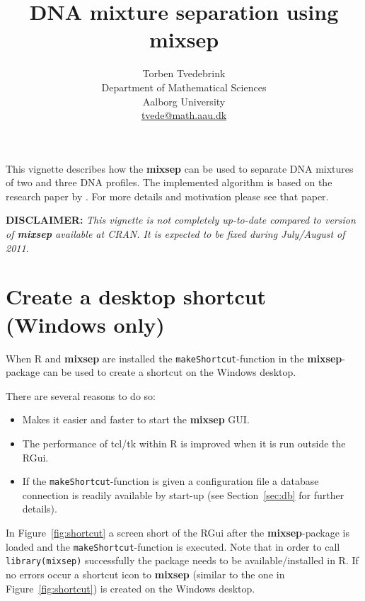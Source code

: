 \documentclass[a4paper,11pt]{article}
\newcommand{\code}[1]{\texttt{#1}}
\newcommand{\pkg}[1]{\textbf{#1}}
\begin{document}


\title{DNA mixture separation using \pkg{mixsep}}
\author{Torben Tvedebrink\\
  Department of Mathematical Sciences\\ Aalborg University\\
  \url{tvede@math.aau.dk}
}
\maketitle
\sloppy

\noindent This vignette describes how the \pkg{mixsep} can be used to
separate DNA mixtures of two and three DNA profiles. The implemented
algorithm is based on the research paper by \cite{tvedebrink2011}. For
more details and motivation please see that paper. 

\textbf{DISCLAIMER:} \textsl{This vignette is not completely
  up-to-date compared to version of \pkg{mixsep} available at CRAN. It
  is expected to be fixed during July/August of 2011.}

\tableofcontents

\newpage

\section{Create a desktop shortcut (Windows only)}
\label{sec:shortcut}

When \textsf{R} and \pkg{mixsep} are installed the
\code{makeShortcut}-function in the \pkg{mixsep}-package can be used
to create a shortcut on the Windows desktop. 

There are several reasons to do so: 
\begin{itemize}
\item Makes it easier and faster to start the \pkg{mixsep} GUI.
\item The performance of tcl/tk within R is improved when it is run
  outside the RGui.
\item If the \code{makeShortcut}-function is given a configuration
  file a database connection is readily available by start-up (see
  Section~\ref{sec:db} for further details).
\end{itemize}

In Figure~\ref{fig:shortcut} a screen short of the RGui after the
\pkg{mixsep}-package is loaded and the \code{makeShortcut}-function is
executed. Note that in order to call \code{library(mixsep)}
successfully the package needs to be available/installed in
\textsf{R}. If no errors occur a shortcut icon to \pkg{mixsep}
(similar to the one in Figure~\ref{fig:shortcut}) is created on the
Windows desktop.
\end{document}
